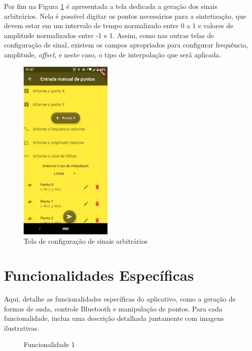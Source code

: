 \documentclass[12pt,a4paper]{book}
\begin{document}
Por fim na Figura \ref{fig:arb} é apresentada a tela dedicada a geração dos sinais arbitrários. Nela é possível digitar os pontos necessários para a sintetização, que devem estar em um intervalo de tempo normalizado entre 0 a 1 e valores de amplitude normalizados entre -1 e 1. Assim, como nas outras telas de configuração de sinal, existem os campos apropriados para configurar frequência, amplitude, \textit{offset}, e neste caso, o tipo de interpolação que será aplicada.

\begin{figure}[hbt!]
    \centering    
    \includegraphics[width=0.4\textwidth]{figs/arb.png}
    \caption{Tela de configuração de sinais arbitrários}
    \label{fig:arb}
\end{figure}


\section{Funcionalidades Específicas}

Aqui, detalhe as funcionalidades específicas do aplicativo, como a geração de formas de onda, controle Bluetooth e manipulação de pontos. Para cada funcionalidade, inclua uma descrição detalhada juntamente com imagens ilustrativas.

\begin{figure}[h]
\centering
\caption{Funcionalidade 1}
\end{figure}
\end{document}

